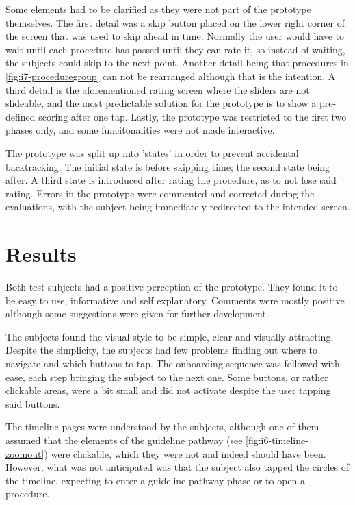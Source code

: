 Some elements had to be clarified as they were not part of the prototype themselves. The first detail was a skip button placed on the lower right corner of the screen that was used to skip ahead in time. Normally the user would have to wait until each procedure has passed until they can rate it, so instead of waiting, the subjects could skip to the next point. Another detail being that procedures in \autoref{fig:i7-proceduregroup} can not be rearranged although that is the intention. A third detail is the aforementioned rating screen where the sliders are not slideable, and the most predictable solution for the prototype is to show a pre-defined scoring after one tap. Lastly, the prototype was restricted to the first two phases only, and some funcitonalities were not made interactive.

The prototype was split up into 'states' in order to prevent accidental backtracking. The initial state is before skipping time; the second state being after. A third state is introduced after rating the procedure, as to not lose said rating. Errors in the prototype were commented and corrected during the evaluations, with the subject being immediately redirected to the intended screen.

\section{Results}

Both test subjects had a positive perception of the prototype. They found it to be easy to use, informative and self explanatory. Comments were mostly positive although some suggestions were given for further development.

The subjects found the visual style to be simple, clear and visually attracting. Despite the simplicity, the subjects had few problems finding out where to navigate and which buttons to tap. The onboarding sequence was followed with ease, each step bringing the subject to the next one. Some buttons, or rather clickable areas, were a bit small and did not activate despite the user tapping said buttons.

The timeline pages were understood by the subjects, although one of them assumed that the elements of the guideline pathway (see \autoref{fig:i6-timeline-zoomout}) were clickable, which they were not and indeed should have been. However, what was not anticipated was that the subject also tapped the circles of the timeline, expecting to enter a guideline pathway phase or to open a procedure.

